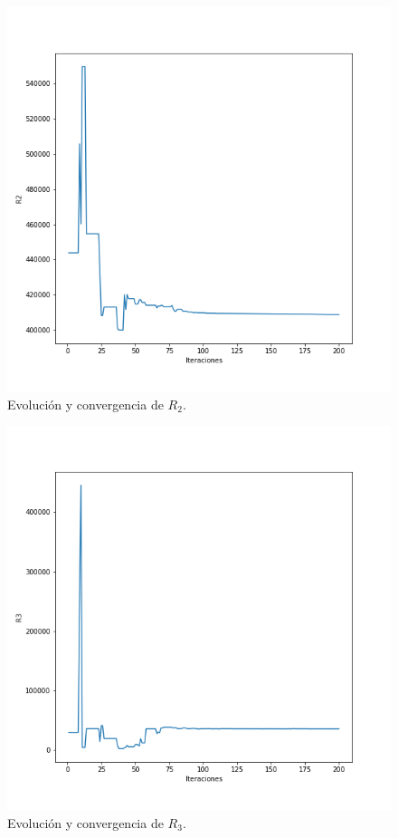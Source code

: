 \documentclass{llncs}
\begin{document}
	\begin{figure}[H]
		\includegraphics[width=\linewidth]{ContinuoLibre/R2.png}
		\caption{Evolución y convergencia de $R_2$.}
		\label{fig:R2ContinuoLibre}
	\end{figure}

	\begin{figure}[H]
		\includegraphics[width=\linewidth]{ContinuoLibre/R3.png}
		\caption{Evolución y convergencia de $R_3$.}
		\label{fig:R3ContinuoLibre}
	\end{figure}
\end{document}
